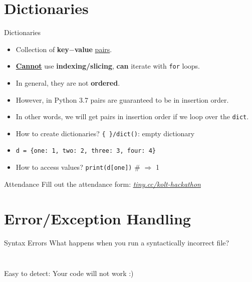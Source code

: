     \section{Dictionaries}
    \begin{frame}{Dictionaries}
        \Large
        \begin{itemize}
            \item Collection of \textbf{key$-$value} \underline{pairs}.
            \pause
            \item \underline{\textbf{Cannot}} use \textbf{indexing/slicing}, \textbf{can} iterate with \texttt{for} loops.
            \pause
            \item In general, they are not \textbf{ordered}.
            \pause
            \item However, in Python 3.7 pairs are guaranteed to be in insertion order.
            \pause
            \item In other words, we will get pairs in insertion order if we loop over the \texttt{dict}.
            \pause
            \item How to create dictionaries?
            \pause
             \texttt{\{\ \}/dict()}: empty dictionary
            \pause
            \item \texttt{d = \{\textquotesingle one\textquotesingle : 1, \textquotesingle two\textquotesingle : 2, \textquotesingle three\textquotesingle : 3, \textquotesingle four\textquotesingle : 4\}}
            \pause
            \item How to access values?
            \pause
             \texttt{print(d[\textquotesingle one\textquotesingle ])} \# $\Rightarrow$ 1
        \end{itemize}
    \end{frame}

    \begin{frame}{Attendance}
        \Huge
        Fill out the attendance form: \href{http://tiny.cc/kolt-hackathon}{\underline{\textit{tiny.cc/kolt-hackathon}}}
    \end{frame}

    \section{Error/Exception Handling}
    \begin{frame}{Syntax Errors}
        \LARGE
        What happens when you run a syntactically incorrect file?
        \pause
        \inputminted[frame=single,framesep=2pt,firstline=1,lastline=3]{python3}{code-examples/syntax_error.py}
        \pause
        \inputminted[frame=single,framesep=2pt,firstline=5]{python3}{code-examples/syntax_error.py}
        Easy to detect: Your code will not work :)
    \end{frame}

